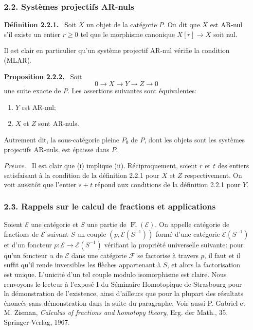\documentclass[11pt]{article}
\newenvironment{statement}[1]{\par\medskip\noindent\textbf{#1.}\ }{\par\medskip}
\newenvironment{prooftext}[1][Proof]{\par\noindent\emph{#1.}\ }{\par\medskip}
\providecommand{\Fl}{\operatorname{Fl}}
\providecommand{\cE}{\mathcal E}
\providecommand{\cF}{\mathcal F}
\begin{document}
\subsubsection*{2.2. Systèmes projectifs AR-nuls}
\begin{statement}{Définition 2.2.1}
Soit $X$ un objet de la catégorie $P$. On dit que $X$ est AR-nul s'il existe un entier $r\ge0$ tel que le morphisme canonique $X[r]\to X$ soit nul.
\end{statement}
Il est clair en particulier qu'un système projectif AR-nul vérifie la condition (MLAR).

\begin{statement}{Proposition 2.2.2}
Soit
\[
0\longrightarrow X\longrightarrow Y\longrightarrow Z\longrightarrow0
\]
une suite exacte de $P$. Les assertions suivantes sont équivalentes:
\begin{enumerate}[label=(\roman*)]
\item $Y$ est AR-nul;
\item $X$ et $Z$ sont AR-nuls.
\end{enumerate}
Autrement dit, la sous-catégorie pleine $P_0$ de $P$, dont les objets sont les systèmes projectifs AR-nuls, est épaisse dans $P$.
\end{statement}

\begin{prooftext}[Preuve]
Il est clair que (i) implique (ii). Réciproquement, soient $r$ et $t$ des entiers satisfaisant à la condition de la définition 2.2.1 pour $X$ et $Z$ respectivement. On voit aussitôt que l'entier $s+t$ répond aux conditions de la définition 2.2.1 pour $Y$.
\end{prooftext}

\subsubsection*{2.3. Rappels sur le calcul de fractions et applications}
Soient $\cE$ une catégorie et $S$ une partie de $\Fl(\cE)$. On appelle catégorie de fractions de $\cE$ suivant $S$ un couple $(p,\cE(S^{-1}))$ formé d'une catégorie $\cE(S^{-1})$ et d'un foncteur $p:\cE\to\cE(S^{-1})$ vérifiant la propriété universelle suivante: pour qu'un foncteur $u$ de $\cE$ dans une catégorie $\cF$ se factorise à travers $p$, il faut et il suffit qu'il rende inversibles les flèches appartenant à $S$, et alors la factorisation est unique. L'unicité d'un tel couple modulo isomorphisme est claire. Nous renvoyons le lecteur à l'exposé I du Séminaire Homotopique de Strasbourg pour la démonstration de l'existence, ainsi d'ailleurs que pour la plupart des résultats énoncés sans démonstration dans la suite du paragraphe. Voir aussi P. Gabriel et M. Zisman, \emph{Calculus of fractions and homotopy theory}, Erg. der Math., 35, Springer-Verlag, 1967.
\end{document}
